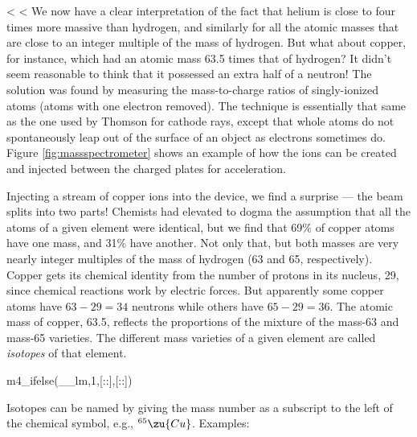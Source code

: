     <%
    <%
        We now have a clear interpretation of the fact that helium
        is close to four times more massive than hydrogen, and
        similarly for all the atomic masses that are close to an
        integer multiple of the mass of hydrogen. But what about
        copper, for instance, which had an atomic mass 63.5 times
        that of hydrogen? It didn't seem reasonable to think that it
        possessed an extra half of a neutron! The solution was found
        by measuring the mass-to-charge ratios of singly-ionized
        atoms (atoms with one electron removed). The technique is
        essentially that same as the one used by Thomson for cathode
        rays, except that whole atoms do not spontaneously leap out
        of the surface of an object as electrons sometimes do. 
        Figure \ref{fig:massspectrometer} shows an example of how the ions can be created and
        injected between the charged plates for acceleration.

        Injecting a stream of copper ions into the device, we find a
        surprise --- the beam splits into two parts! Chemists had
        elevated to dogma the assumption that all the atoms of a
        given element were identical, but we find that 69\% of
        copper atoms have one mass, and 31\% have another.  Not only
        that, but both masses are very nearly integer multiples of
        the mass of hydrogen (63 and 65, respectively).  Copper gets
        its chemical identity from the number of protons in its
        nucleus, 29, since chemical reactions work by electric
        forces. But apparently some copper atoms have $63-29=34$
        neutrons while others have $65-29=36$. The atomic mass of
        copper, 63.5, reflects the proportions of the mixture of the
        mass-63 and mass-65 varieties.  The different mass varieties
        of a given element are called \emph{isotopes} of that element.

m4_ifelse(__lm,1,[:\pagebreak:],[::])

        Isotopes can be named by giving the mass number as a
        subscript to the left of the chemical symbol, e.g.,
        $^{65}\zu{Cu}$. Examples:

